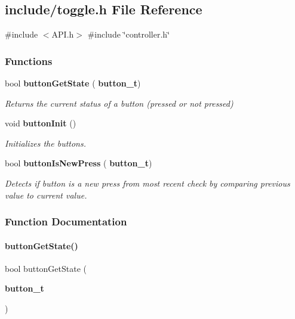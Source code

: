 \subsection{include/toggle.h File Reference}
\label{toggle_8h}
{\ttfamily \#include $<$A\+P\+I.\+h$>$}\newline
{\ttfamily \#include \char`\"{}controller.\+h\char`\"{}}\newline
\subsubsection*{Functions}
\begin{DoxyCompactItemize}
\item 
bool \textbf{ button\+Get\+State} (\textbf{ button\+\_\+t})
\begin{DoxyCompactList}\small\item\em Returns the current status of a button (pressed or not pressed) \end{DoxyCompactList}\item 
void \textbf{ button\+Init} ()
\begin{DoxyCompactList}\small\item\em Initializes the buttons. \end{DoxyCompactList}\item 
bool \textbf{ button\+Is\+New\+Press} (\textbf{ button\+\_\+t})
\begin{DoxyCompactList}\small\item\em Detects if button is a new press from most recent check by comparing previous value to current value. \end{DoxyCompactList}\end{DoxyCompactItemize}


\subsubsection{Function Documentation}
\mbox{\label{toggle_8h_a72989c21af9d14672f6e59c44a2b59bc}} 
\paragraph{button\+Get\+State()}
{\footnotesize\ttfamily bool button\+Get\+State (\begin{DoxyParamCaption}\item[{\textbf{ button\+\_\+t}}]{ }\end{DoxyParamCaption})}



